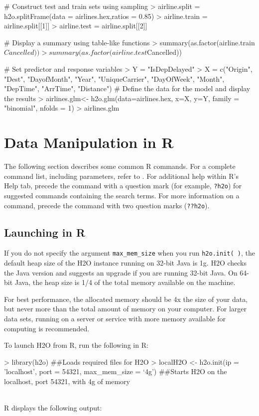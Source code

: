 \documentclass[11pt]{article}
\begin{document}
\begin{enumerate}
\begin{spverbatim}
# Construct test and train sets using sampling
> airline.split = h2o.splitFrame(data = airlines.hex,ratios = 0.85)
> airline.train = airline.split[[1]]
> airline.test = airline.split[[2]]

# Display a summary using table-like functions
> summary(as.factor(airline.train$Cancelled))
> summary(as.factor(airline.test$Cancelled))

# Set predictor and response variables
> Y = "IsDepDelayed"
> X = c("Origin", "Dest", "DayofMonth", "Year", "UniqueCarrier", "DayOfWeek", "Month", "DepTime", "ArrTime", "Distance")
# Define the data for the model and display the results
> airlines.glm<- h2o.glm(data=airlines.hex, x=X, y=Y, family = "binomial", nfolds = 1)
> airlines.glm
\end{spverbatim}

\section{Data Manipulation in R}

The following section describes some common R commands. For a complete command list, including parameters, refer to .
For additional help within R's Help tab, precede the command with a question mark (for example, {\texttt{?h2o}}) for suggested commands containing the search terms. For more information on a command, precede the command with two question marks ({\texttt{??h2o}}). 

\subsection{Launching in R}

If you do not specify the argument {\texttt{max\_mem\_size}} when you run {\texttt{h2o.init( )}}, the default heap size of the H2O instance running on 32-bit Java is 1g. H2O checks the Java version and suggests an upgrade if you are running 32-bit Java. On 64-bit Java, the heap size is 1/4 of the total memory available on the machine. 

For best performance, the allocated memory should be 4x the size of your data, but never more than the total amount of memory on your computer. For larger data sets, running on a server or service with more memory available for computing is recommended.

To launch H2O from R, run the following in R:
\begin{spverbatim}
> library(h2o) ##Loads required files for H2O
> localH2O <- h2o.init(ip = 'localhost', port = 54321, max_mem_size = ‘4g') ##Starts H2O on the localhost, port 54321, with 4g of memory  \end{spverbatim} 
\\
R displays the following output: 
\begin{spverbatim}


\end{spverbatim}
\end{enumerate}
\end{document}
